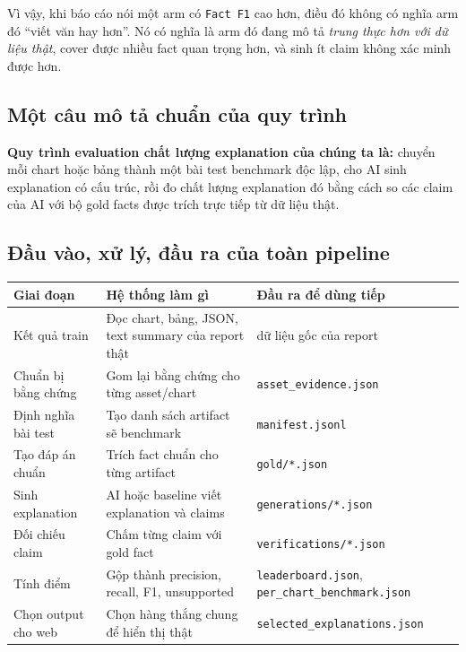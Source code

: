 \documentclass[11pt,a4paper]{article}
\newcommand{\field}[1]{\texttt{#1}}
\begin{document}
Vì vậy, khi báo cáo nói một arm có \field{Fact F1} cao hơn, điều đó không có nghĩa arm đó ``viết văn hay hơn''.
Nó có nghĩa là arm đó đang mô tả \emph{trung thực hơn với dữ liệu thật}, cover được nhiều fact quan trọng hơn,
và sinh ít claim không xác minh được hơn.

\subsection{Một câu mô tả chuẩn của quy trình}
\textbf{Quy trình evaluation chất lượng explanation của chúng ta là:}
chuyển mỗi chart hoặc bảng thành một bài test benchmark độc lập, cho AI sinh explanation có cấu trúc,
rồi đo chất lượng explanation đó bằng cách so các claim của AI với bộ gold facts được trích trực tiếp từ dữ liệu thật.

\subsection{Đầu vào, xử lý, đầu ra của toàn pipeline}
\begin{table}[h]
\centering
\small
\begin{tabular}{>{\raggedright\arraybackslash}p{3.3cm} >{\raggedright\arraybackslash}p{4.9cm} >{\raggedright\arraybackslash}p{5.1cm}}
\toprule
Giai đoạn & Hệ thống làm gì & Đầu ra để dùng tiếp \\
\midrule
Kết quả train & Đọc chart, bảng, JSON, text summary của report thật & dữ liệu gốc của report \\
Chuẩn bị bằng chứng & Gom lại bằng chứng cho từng asset/chart & \field{asset\_evidence.json} \\
Định nghĩa bài test & Tạo danh sách artifact sẽ benchmark & \field{manifest.jsonl} \\
Tạo đáp án chuẩn & Trích fact chuẩn cho từng artifact & \field{gold/*.json} \\
Sinh explanation & AI hoặc baseline viết explanation và claims & \field{generations/*.json} \\
Đối chiếu claim & Chấm từng claim với gold fact & \field{verifications/*.json} \\
Tính điểm & Gộp thành precision, recall, F1, unsupported & \field{leaderboard.json}, \field{per\_chart\_benchmark.json} \\
Chọn output cho web & Chọn hàng thắng chung để hiển thị thật & \field{selected\_explanations.json} \\
\bottomrule
\end{tabular}
\end{table}
\end{document}
